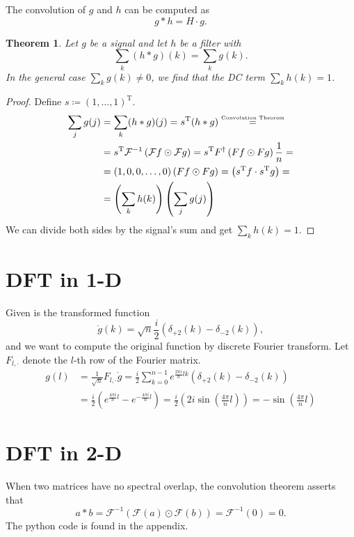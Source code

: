 \documentclass[11pt]{scrartcl}
\newcommand{\FT}{\mathcal{F}}
\newcommand{\T}{\mathrm{T}}
\newcommand{\IFT}{\mathcal{F}^{-1}}
\newcommand{\conv}{\ast}
\newcommand{\defined}{\coloneqq}
\newtheorem*{theorem}{Theorem}
\begin{document}
%
The convolution of $g$ and $h$ can be computed as 
%
\begin{equation*}
 g\conv h = H\cdot g.
\end{equation*}
%
\begin{theorem}
Let $g$ be a signal and let $h$ be a filter with 
\[
\sum_k (h\conv g)(k) = \sum_k g(k). 
\]
In the general case $\sum_k g(k) \neq 0$, we find that the DC term $\sum_k h(k) = 1$.
\end{theorem}
\begin{proof}
Define $s\defined(1,\ldots,1)^\T$.
%
\begin{align*}
\sum_j g(j) &= \sum_k (h\conv g)(j) = s^\T(h\conv g) \stackrel{\text{\tiny Convolution Theorem}}{=}\\
            &= s^\T \IFT\left(\FT f\odot\FT g\right) = s^\T F^\dagger\left(Ff\odot Fg\right)\frac{1}{n} = \\
            &= (1,0,0,\ldots,0)\left(Ff\odot Fg\right) = \left(s^\T f\cdot s^\T g\right) = \\
            &= \left(\sum_k h(k)\right)\left(\sum_j g(j)\right)
\end{align*}
%
We can divide both sides by the signal's sum and get $\sum_k h(k) = 1$.
\end{proof}

\section{DFT in 1-D}
Given is the transformed function 
\[
 \mathring g(k) = \sqrt{n}\frac{i}{2}\left(\delta_{+2}(k) - \delta_{-2}(k)\right),
\]
and we want to compute the original function by discrete Fourier transform. Let $F_{l,\cdot}$ denote the $l$-th row of the Fourier matrix.
\begin{align*}
g(l) &= \frac{1}{\sqrt n} F_{l,\cdot} \mathring g= \frac i 2 \sum_{k=0}^{n-1}e^{\frac{2\pi i}{n} l k}\left(\delta_{+2}(k) - \delta_{-2}(k)\right) \\
     &= \frac i 2 \left(e^{\frac{4\pi i}{n} l} - e^{-\frac{4\pi i}{n}l}\right) = \frac i 2 \left(2i\sin\left(\frac{4\pi}{n}l\right)\right) = -\sin\left(\frac{4\pi}{n}l\right)
\end{align*}

\section{DFT in 2-D}
When two matrices have no spectral overlap, the convolution theorem asserts that 
\[
 a\conv b = \IFT\left(\FT(a)\odot\FT(b)\right) = \IFT(0) = 0.
\]
The python code is found in the appendix.
\end{document}
